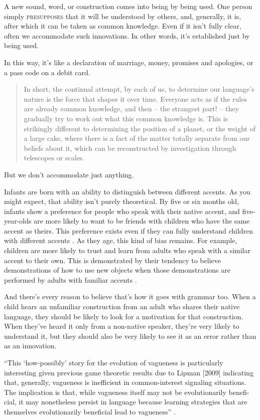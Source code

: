 A new sound, word, or construction comes into being by being used. One person simply \textsc{presupposes} that it will be understood by others, and, generally, it is, after which it can be taken as common knowledge. Even if it isn't fully clear, often we accommodate such innovations. In other words, it's established just by being used.

In this way, it's like a declaration of marriage, money, promises and apologies, or a pass code on a debit card. 

\begin{quote}
In short, the continual attempt, by each of us, to determine our language's nature is the force that shapes it over time. Everyone acts as if the rules are already common knowledge, and then -- the strangest part! -- they gradually try to work out what this common knowledge is. This is strikingly different to determining the position of a planet, or the weight of a large cake, where there is a fact of the matter totally separate from our beliefs about it, which can be reconstructed by investigation through telescopes or scales. \hfill\citep{CohnGordon2024}
\end{quote}

\bigskip

But we don't accommodate just anything. 

Infants are born with an ability to distinguish between different accents. As you might expect, that ability isn't purely theoretical. By five or six months old, infants show a preference for people who speak with their native accent, and five-year-olds are more likely to want to be friends with children who have the same accent as theirs. This preference exists even if they can fully understand children with different accents \citep{Kinzler2007}. As they age, this kind of bias remains. For example, children are more likely to trust and learn from adults who speak with a similar accent to their own. This is demonstrated by their tendency to believe demonstrations of how to use new objects when those demonstrations are performed by adults with familiar accents \citep{Kinzler2011a}.

And there's every reason to believe that's how it goes with grammar too. When a child hears an unfamiliar construction from an adult who shares their native language, they should be likely to look for a motivation for that construction. When they've heard it only from a non-native speaker, they're very likely to understand it, but they should also be very likely to see it as an error rather than as an innovation.

\enquote{This \enquote{how-possibly} story for the evolution of vagueness is particularly interesting given previous game theoretic results due to Lipman [2009] indicating that, generally, vagueness is inefficient in common-interest signaling situations. The implication is that, while vagueness itself may not be evolutionarily benefi- cial, it may nonetheless persist in language because learning strategies that are themselves evolutionarily beneficial lead to vagueness} \citep[708]{OConnor2014}.
